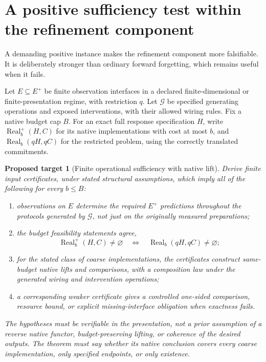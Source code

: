 \documentclass[11pt]{article}
\newtheorem{target}[definition]{Proposed target}
\theoremstyle{remark}
\newcommand{\Real}{\operatorname{Real}}
\begin{document}
\section{A positive sufficiency test within the refinement component}
\label{sec:finite-sufficiency}

A demanding positive instance makes the refinement component more falsifiable. It is deliberately stronger than ordinary forward forgetting, which remains useful when it fails.

Let $E\subseteq E^+$ be finite observation interfaces in a declared finite-dimensional or finite-presentation regime, with restriction $q$. Let $\mathcal G$ be specified generating operations and exposed interventions, with their allowed wiring rules. Fix a native budget cap $B$. For an exact full response specification $H$, write $\Real^+_b(H,C)$ for its native implementations with cost at most $b$, and $\Real_b(qH,qC)$ for the restricted problem, using the correctly translated commitments.

\begin{target}[Finite operational sufficiency with native lift]
\label{target:finite}
Derive finite input certificates, under stated structural assumptions, which imply all of the following for every $b\leq B$:
\begin{enumerate}
\item observations on $E$ determine the required $E^+$ predictions throughout the protocols generated by $\mathcal G$, not just on the originally measured preparations;
\item the budget feasibility statements agree,
\begin{equation}
 \Real^+_b(H,C)\ne\varnothing
 \quad\Longleftrightarrow\quad
 \Real_b(qH,qC)\ne\varnothing;
 \label{eq:budget-exactness}
\end{equation}
\item for the stated class of coarse implementations, the certificates construct same-budget native lifts and comparisons, with a composition law under the generated wiring and intervention operations;
\item a corresponding weaker certificate gives a controlled one-sided comparison, resource bound, or explicit missing-interface obligation when exactness fails.
\end{enumerate}
The hypotheses must be verifiable in the presentation, not a prior assumption of a reverse native functor, budget-preserving lifting, or coherence of the desired outputs. The theorem must say whether its native conclusion covers every coarse implementation, only specified endpoints, or only existence.
\end{target}
\end{document}
